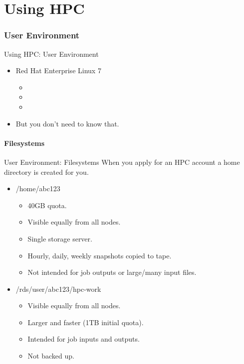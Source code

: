 \part{Using HPC}
\begin{frame}
\partpage
\end{frame}

\section{User Environment}
\begin{frame}{Using HPC: User Environment}
\begin{itemize}
\item<1,3->{\alert<1>{{Red Hat Enterprise Linux 7}}}
\begin{itemize}
\item{}
\item{}
\item{}
\end{itemize}
\item<2->{But you don't need to know that.}
\end{itemize}
\end{frame}

\subsection{Filesystems}
\begin{frame}{User Environment: Filesystems}
When you apply for an HPC account a home directory is created for you. 
\begin{itemize}
\item{\alert{/home/abc123}}
\begin{itemize}
\item{40GB quota.}
\item{Visible equally from all nodes.}
\item{Single storage server.}
\item{Hourly, daily, weekly snapshots copied to tape.}
\item{Not intended for job outputs or large/many input files.}
\end{itemize}
\item{\alert{/rds/user/abc123/hpc-work}}
\begin{itemize}
\item{Visible equally from all nodes.}
\item{Larger and faster (1TB initial quota).}
\item{Intended for job inputs and outputs.}
\item{{\color{red}Not backed up.}}
 \pause
\end{itemize}
\end{itemize}
\end{frame}

